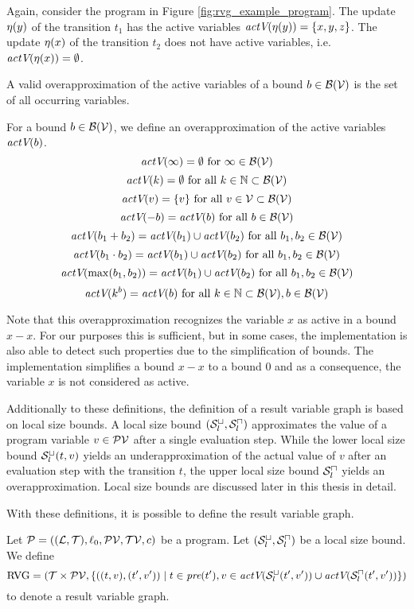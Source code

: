 Again, consider the program in Figure \ref{fig:rvg_example_program}.
The update $\eta(y)$ of the transition $t_1$ has the active variables $\emph{actV}(\eta(y)) = \lbrace x,y,z \rbrace$.
The update $\eta(x)$ of the transition $t_2$ does not have active variables, i.e. $\emph{actV}(\eta(x)) = \emptyset$.

A valid overapproximation of the active variables of a bound $b \in \mathcal{B}(\mathcal{V})$ is the set of all occurring variables.
\begin{definition}
  For a bound $b \in \mathcal{B}(\mathcal{V})$, we define an overapproximation of the active variables $\emph{actV}(b)$.
  \[ \emph{actV}(\infty) = \emptyset \text{ for } \infty \in \mathcal{B}(\mathcal{V}) \]
  \[ \emph{actV}(k) = \emptyset \text{ for all } k \in \mathbb{N} \subset \mathcal{B}(\mathcal{V}) \] 
  \[ \emph{actV}(v) = \lbrace v \rbrace \text{ for all } v \in \mathcal{V} \subset \mathcal{B}(\mathcal{V}) \] 
  \[ \emph{actV}(-b) = \emph{actV}(b) \text{ for all } b \in \mathcal{B}(\mathcal{V}) \] 
  \[ \emph{actV}(b_1 + b_2) = \emph{actV}(b_1) \cup \emph{actV}(b_2) \text{ for all } b_1, b_2 \in \mathcal{B}(\mathcal{V}) \] 
  \[ \emph{actV}(b_1 \cdot b_2) = \emph{actV}(b_1) \cup \emph{actV}(b_2) \text{ for all } b_1, b_2 \in \mathcal{B}(\mathcal{V}) \] 
  \[ \emph{actV}(\max(b_1, b_2)) = \emph{actV}(b_1) \cup \emph{actV}(b_2) \text{ for all } b_1, b_2 \in \mathcal{B}(\mathcal{V}) \]
  \[ \emph{actV}(k^b) = \emph{actV}(b) \text{ for all } k \in \mathbb{N} \subset \mathcal{B}(\mathcal{V}), b \in \mathcal{B}(\mathcal{V}) \]  
\end{definition}

Note that this overapproximation recognizes the variable $x$ as active in a bound $x - x$.
For our purposes this is sufficient, but in some cases, the implementation is also able to detect such properties due to the simplification of bounds.
The implementation simplifies a bound $x - x$ to a bound $0$ and as a consequence, the variable $x$ is not considered as active.

Additionally to these definitions, the definition of a result variable graph is based on local size bounds.
A local size bound ${({\mathcal{S}^\sqcup_l}, {\mathcal{S}^\sqcap_l})}$ approximates the value of a program variable $v \in \mathcal{PV}$ after a single evaluation step.
While the lower local size bound ${\mathcal{S}^\sqcup_l}(t,v)$ yields an underapproximation of the actual value of $v$ after an evaluation step with the transition $t$, the upper local size bound ${\mathcal{S}^\sqcap_l}$ yields an overapproximation.
Local size bounds are discussed later in this thesis in detail.

With these definitions, it is possible to define the result variable graph.

\begin{definition}
  Let $\mathcal{P} = ((\mathcal{L}, \mathcal{T}), \ell_0, \mathcal{PV}, \mathcal{TV}, c)$ be a program.
  Let ${({\mathcal{S}^\sqcup_l}, {\mathcal{S}^\sqcap_l})}$ be a local size bound.
  We define 
  \[ \text{RVG} = (\mathcal{T} \times \mathcal{PV}, \lbrace ((t, v), (t', v')) \mid t \in \emph{pre}(t'), v \in \emph{actV}({\mathcal{S}^\sqcup_l}(t',v')) \cup \emph{actV}({\mathcal{S}^\sqcap_l}(t',v')) \rbrace) \]
  to denote a result variable graph.
\end{definition}

